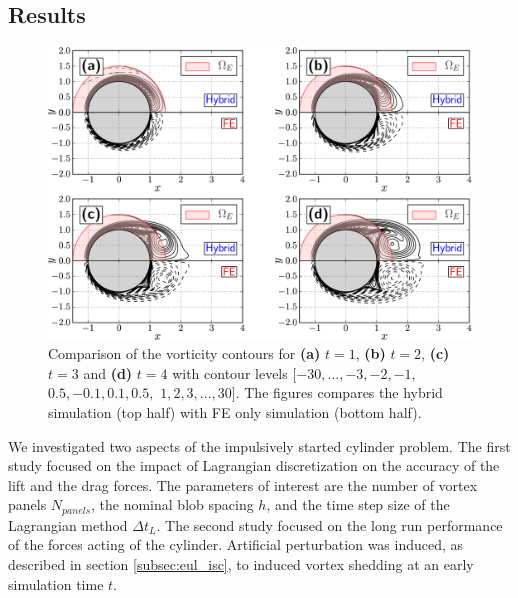 

\subsection{Results}

	\begin{figure}[!p]
	\centering
	\includegraphics[width=\linewidth]{./figures/validation/isc/hybrid_diffTs-crop.pdf}
	\caption{Comparison of the vorticity contours for \textbf{(a)} $t=1$, \textbf{(b)} $t=2$, \textbf{(c)} $t=3$ and \textbf{(d)} $t=4$ with contour levels $[-30,..., -3, -2, -1,$ $0.5, -0.1, 0.1, 0.5,$ $1, 2, 3,..., 30]$. The figures compares the hybrid simulation (top half) with FE only simulation (bottom half).}
	\label{fig:hybrid_cylinder_contourComparison_tStarting}
	\end{figure}

We investigated two aspects of the impulsively started cylinder problem. The first study focused on the impact of Lagrangian discretization on the accuracy of the lift and the drag forces. The parameters of interest are the number of vortex panels $N_{panels}$, the nominal blob spacing $h$, and the time step size of the Lagrangian method $\Delta t_L$. The second study focused on the long run performance of the forces acting of the cylinder. Artificial perturbation was induced, as described in section \ref{subsec:eul_isc}, to induced vortex shedding at an early simulation time $t$.

